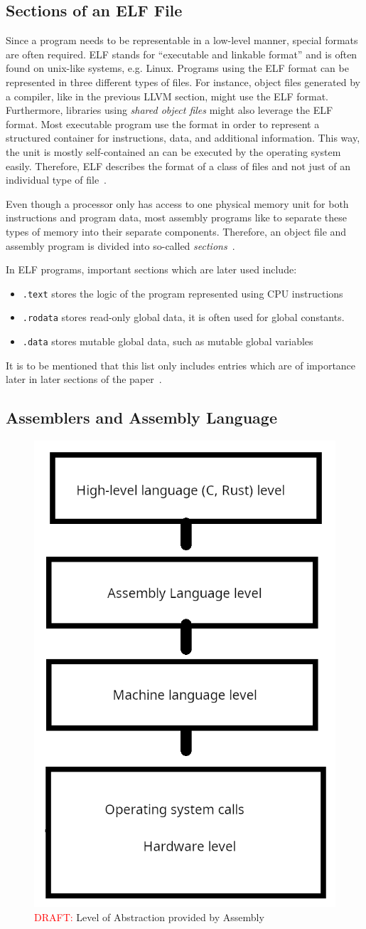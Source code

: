 \subsection{Sections of an ELF File}
Since a program needs to be representable in a low-level manner, special formats are often required.
ELF stands for \enquote{executable and linkable format} and is often found on unix-like systems, e.g. Linux.
Programs using the ELF format can be represented in three different types of files.
For instance, object files generated by a compiler, like in the previous LLVM section, might use the ELF format.
Furthermore, libraries using \emph{shared object files} might also leverage the ELF format.
Most executable program use the format in order to represent a structured container for instructions, data, and additional information.
This way, the unit is mostly self-contained an can be executed by the operating system easily.
Therefore, ELF describes the format of a class of files and not just of an individual type of file~\cite[p.~74-76]{Zhirkov2017-wk}.

Even though a processor only has access to one physical memory unit for both instructions and program data,
most assembly programs like to separate these types of memory into their separate components.
Therefore, an object file and assembly program is divided into so-called \emph{sections}~\cite[p.~19]{Zhirkov2017-wk}.

In ELF programs, important sections which are later used include:
\begin{itemize}
	\item \texttt{.text} stores the logic of the program represented using CPU instructions
	\item \texttt{.rodata} stores read-only global data, it is often used for global constants.
	\item \texttt{.data} stores mutable global data, such as mutable global variables
\end{itemize}

It is to be mentioned that this list only includes entries which are of importance later in later sections of the paper~\cite[p.~76]{Zhirkov2017-wk}.

\subsection{Assemblers and Assembly Language}

\begin{figure}
	\centering
	\includegraphics[width=.25\textwidth]{./abstractions_draft.png}
	\caption{\textcolor{red}{DRAFT:} Level of Abstraction provided by Assembly}\label{fig:abstractions}
\end{figure}

